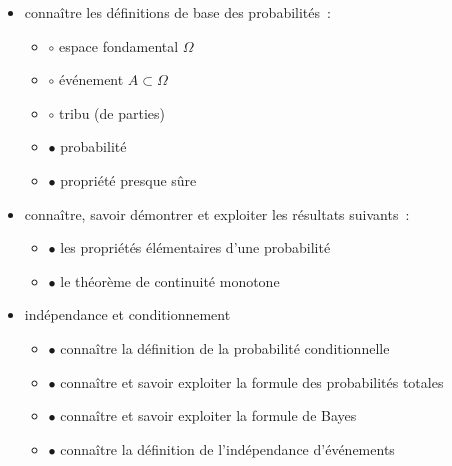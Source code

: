 \begin{itemize}
\item
  connaître les définitions de base des probabilités~:

  \begin{itemize}
  \tightlist
  \item
    $\mathord{\boldsymbol{\circ}}$ espace fondamental \(\Omega\)
  \item
    $\mathord{\boldsymbol{\circ}}$ événement \(A \subset \Omega\)
  \item
    $\mathord{\boldsymbol{\circ}}$ tribu (de parties)
  \item
    $\mathord{\bullet}$ probabilité
  \item
    $\mathord{\bullet}$ propriété presque sûre
  \end{itemize}
\item
  connaître, savoir démontrer et exploiter les résultats suivants~:

  \begin{itemize}
  \tightlist
  \item
    $\mathord{\bullet}$ les propriétés élémentaires d'une probabilité
  \item
    $\mathord{\bullet}$ le théorème de continuité monotone
  \end{itemize}
\item
  indépendance et conditionnement

  \begin{itemize}
  \tightlist
  \item
    $\mathord{\bullet}$ connaître la définition de la probabilité
    conditionnelle
  \item
    $\mathord{\bullet}$ connaître et savoir exploiter la formule des
    probabilités totales
  \item
    $\mathord{\bullet}$ connaître et savoir exploiter la formule de
    Bayes
  \item
    $\mathord{\bullet}$ connaître la définition de l'indépendance
    d'événements
  \end{itemize}
\end{itemize}

\label{I-variables-aluxe9atoires}

